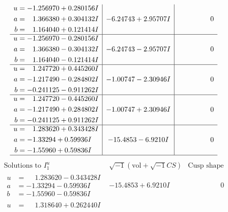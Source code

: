 \documentclass[1p]{elsarticle_modified}
\theoremstyle{definition}
\newcommand{\I}{\sqrt{-1}}
\begin{document}
$$\begin{array}{c|c|c}
\begin{aligned}
u &= -1.256970 + 0.280156 I \\
a &= \phantom{-}1.366380 + 0.304132 I \\
b &= \phantom{-}1.164040 + 0.121414 I\end{aligned}
 & -6.24743 + 2.95707 I & \phantom{-0.000000 } 0 \\ \hline\begin{aligned}
u &= -1.256970 - 0.280156 I \\
a &= \phantom{-}1.366380 - 0.304132 I \\
b &= \phantom{-}1.164040 - 0.121414 I\end{aligned}
 & -6.24743 - 2.95707 I & \phantom{-0.000000 } 0 \\ \hline\begin{aligned}
u &= \phantom{-}1.247720 + 0.445260 I \\
a &= -1.217490 - 0.284802 I \\
b &= -0.241125 - 0.911262 I\end{aligned}
 & -1.00747 - 2.30946 I & \phantom{-0.000000 } 0 \\ \hline\begin{aligned}
u &= \phantom{-}1.247720 - 0.445260 I \\
a &= -1.217490 + 0.284802 I \\
b &= -0.241125 + 0.911262 I\end{aligned}
 & -1.00747 + 2.30946 I & \phantom{-0.000000 } 0 \\ \hline\begin{aligned}
u &= \phantom{-}1.283620 + 0.343428 I \\
a &= -1.33294 + 0.59936 I \\
b &= -1.55960 + 0.59836 I\end{aligned}
 & -15.4853 - 6.9210 I & \phantom{-0.000000 } 0\\
 \hline 
 \end{array}$$\newpage$$\begin{array}{c|c|c}  
\text{Solutions to }I^u_{1}& \I (\text{vol} + \sqrt{-1}CS) & \text{Cusp shape}\\
 \hline 
\begin{aligned}
u &= \phantom{-}1.283620 - 0.343428 I \\
a &= -1.33294 - 0.59936 I \\
b &= -1.55960 - 0.59836 I\end{aligned}
 & -15.4853 + 6.9210 I & \phantom{-0.000000 } 0 \\ \hline\begin{aligned}
u &= \phantom{-}1.318640 + 0.262440 I \\

\end{aligned}
\end{array}$$
\end{document}
